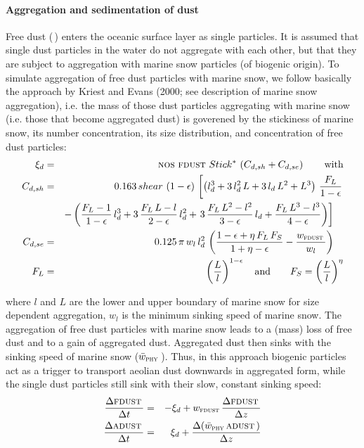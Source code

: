 \documentclass[11pt,a4paper,fleqn,twoside]{article}
\def\phy{\text{\textsc{phy}}\,}
\def\nos{\text{\textsc{nos}}\,}
\def\adust{\text{\textsc{adust}}\,}
\def\fdust{\text{\textsc{fdust}}\,}
\begin{document}
\paragraph{Aggregation and sedimentation of dust} Free dust (\fdust) enters the oceanic
surface layer as single particles. It is assumed that single dust
particles in the water do not aggregate with each other, but that they are
subject to aggregation with marine snow particles (of biogenic origin). To
simulate aggregation of free dust particles with marine snow, we follow
basically the approach by Kriest and Evans (2000; see description of marine
snow  aggregation), i.e. the mass of those dust particles aggregating with
marine snow (i.e. those that become aggregated dust) is goverened by the
stickiness of marine snow, its number concentration, its size distribution,
and concentration of free dust particles:
\begin{eqnarray}
\label{eq_dustagg}
\xi_d & = & \nos \, \fdust \, Stick^* \, \left( C_{d,sh} + C_{d,se} \right) \qquad \mbox{with}\\
C_{d,sh} & = & 0.163 \, shear \,  \left(1-\epsilon \right) \, \left[ 
 \left(l_d^3+3\,l_d^2\,L+3\,l_d\,L^2+L^3 \right)\,\frac{F_L}{1-\epsilon} \right. \\
& & - \left(    \frac{F_L-1   }{1-\epsilon}\,l_d^3
            +3\,\frac{F_L\,L-l}{2-\epsilon}\,l_d^2  
    + \left. 3\,\frac{F_L\,L^2-l^2}{3-\epsilon}\,l_d
+            \frac{ F_L\,L^3-l^3}{4-\epsilon} \right) \right]\quad \nonumber  \\
C_{d,se} & = &  0.125\,\pi\,w_l\,l_d^2\,
\left( \frac{1-\epsilon+\eta\,F_L\,F_S}{1+\eta-\epsilon}-\frac{w_\fdust}{w_l}\right) \quad 
\nonumber \\
F_L & = &  \left( \frac{L}{l}\right)^{1-\epsilon} \quad \mbox{and} \qquad
    F_S =  \left( \frac{L}{l}\right)^{\eta}\nonumber 
\end{eqnarray}

where $l$ and $L$ are the lower and upper boundary of marine snow for size
dependent aggregation, $w_l$ is the minimum sinking speed of marine snow. The
aggregation of free dust particles with marine snow leads to a (mass)  loss of
free dust and to a gain of aggregated dust. Aggregated dust then sinks with the
sinking speed of marine snow ($\bar{w}_\phy$). Thus, in this approach biogenic
particles act as a trigger to transport aeolian dust downwards in aggregated
form, while the single dust particles still sink with their slow, constant
sinking speed:
\begin{eqnarray}
\frac{\Delta  \fdust}{\Delta  t} & = & - \xi_d + w_\fdust \frac{\Delta \fdust}{\Delta z} \\
\frac{\Delta  \adust}{\Delta  t} & = &  \xi_d +  \frac{\Delta (\bar{w}_\phy \adust)}{\Delta z}   
\end{eqnarray}
\end{document}
